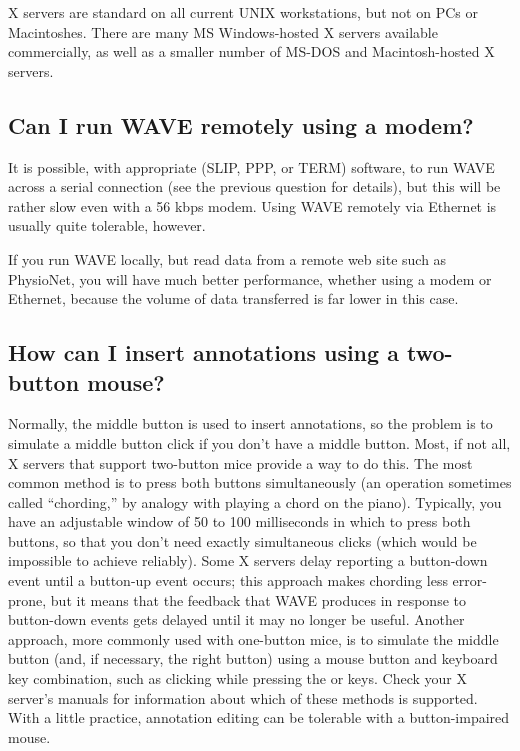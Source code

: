 \documentclass[twoside]{book}
\newcommand{\keycap}[1]{\cornersize{.5}\Ovalbox{\small\sf #1}}
\newcommand{\WAVE}{{\sf WAVE}\xspace}
\begin{document}
X servers are standard on all current UNIX workstations, but not on
PCs or Macintoshes.  There are many MS Windows-hosted X servers
available commercially, as well as a smaller number of MS-DOS and
Macintosh-hosted X servers.

\subsection{Can I run \WAVE{} remotely using a modem?}

It is possible, with appropriate (SLIP, PPP, or TERM) software, to run
\WAVE{} across a serial connection (see the previous question for
details), but this will be rather slow even with a 56 kbps modem.
Using \WAVE{} remotely via Ethernet is usually quite tolerable,
however.

If you run \WAVE{} locally, but read data from a remote web site
such as PhysioNet, you will have much better performance, whether
using a modem or Ethernet, because the volume of data transferred is
far lower in this case.

\subsection{How can I insert annotations using a two-button mouse?}

Normally, the middle button is used to insert annotations, so the problem is
to simulate a middle button click if you don't have a middle button.
Most, if not all, X servers that support two-button mice provide a way to do
this.  The most common method is to press both buttons simultaneously (an
operation sometimes called ``chording,'' by analogy with playing a chord on
the piano).  Typically, you have an adjustable window of 50 to 100 milliseconds
in which to press both buttons, so that you don't need exactly simultaneous
clicks (which would be impossible to achieve reliably).  Some X servers delay
reporting a button-down event until a button-up event occurs;  this approach
makes chording less error-prone, but it means that the feedback that \WAVE{} 
produces in response to button-down events gets delayed until it may no longer
be useful.  Another approach, more commonly used with one-button mice, is to
simulate the middle button (and, if necessary, the right button) using a
mouse button and keyboard key combination, such as clicking while pressing the
\keycap{SHIFT} or \keycap{CTRL} keys.  Check your X server's manuals for
information about which of these methods is supported.  With a little practice,
annotation editing can be tolerable with a button-impaired mouse.
\end{document}

